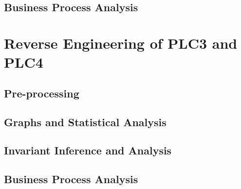 \subsection{Business Process Analysis}
\label{subsec:6_P2P3_bpa}

\section{Reverse Engineering of PLC3 and PLC4}
\label{sec:6_P3P4_analysis}

\subsection{Pre-processing}
\label{subsec:6_P3P4_preprocessing}

\subsection{Graphs and Statistical Analysis}
\label{subsec:6_P3P4_graphs}

\subsection{Invariant Inference and Analysis}
\label{subsec:6_P3P4_invariants}

\subsection{Business Process Analysis}
\label{subsec:6_P3P4_bpa}

\vfill
\nolinenumbers